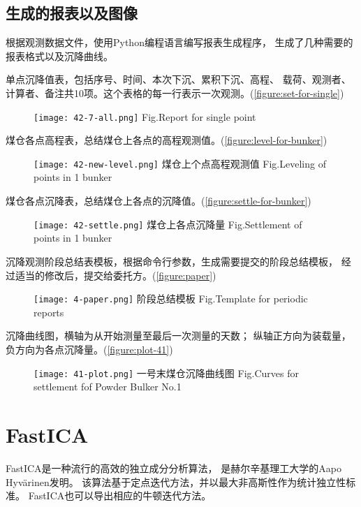 \subsection{生成的报表以及图像}
根据观测数据文件，使用Python编程语言编写报表生成程序，
生成了几种需要的报表格式以及沉降曲线。

单点沉降值表，包括序号、时间、本次下沉、累积下沉、高程、
载荷、观测者、计算者、备注共10项。这个表格的每一行表示一次观测。(\ref{figure:set-for-single})
\begin{figure}[!htbp]
   \centering
   \texttt{[image: 42-7-all.png]}
			{Fig.}{Report for single point}
\end{figure}

煤仓各点高程表，总结煤仓上各点的高程观测值。(\ref{figure:level-for-bunker})
\begin{figure}[!htbp]
   \centering
   \texttt{[image: 42-new-level.png]}
					{煤仓上个点高程观测值}
			{Fig.}{Leveling of points in 1 bunker}
\end{figure}

煤仓各点沉降表，总结煤仓上各点的沉降值。(\ref{figure:settle-for-bunker})
\begin{figure}[!htbp]
   \centering
   \texttt{[image: 42-settle.png]}
					{煤仓上各点沉降量}
			{Fig.}{Settlement of points in 1 bunker}
\end{figure}

沉降观测阶段总结表模板，根据命令行参数，生成需要提交的阶段总结模板，
经过适当的修改后，提交给委托方。(\ref{figure:paper})
\begin{figure}[!htbp]
   \centering
   \texttt{[image: 4-paper.png]}
				    {阶段总结模板}
			{Fig.}{Template for periodic reports}
\end{figure}

沉降曲线图，横轴为从开始测量至最后一次测量的天数；
纵轴正方向为装载量，负方向为各点沉降量。(\ref{figure:plot-41})
\begin{figure}[!htbp]
   \centering
   \texttt{[image: 41-plot.png]}
				    {一号末煤仓沉降曲线图}
			{Fig.}{Curves for settlement fof Powder Bulker No.1}
\end{figure}

\section{FastICA}
FastICA是一种流行的高效的独立成分分析算法，
是赫尔辛基理工大学的Aapo Hyvärinen发明。
该算法基于定点迭代方法，并以最大非高斯性作为统计独立性标准。
FastICA也可以导出相应的牛顿迭代方法。

